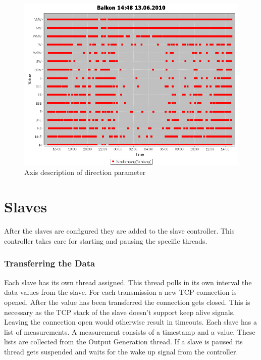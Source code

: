 \begin{figure}[ht]
    \centering
    \includegraphics[width=0.9\linewidth]{master/plot_dir.png}
    \caption{Axis description of direction parameter}
    \label{fig:dir}
\end{figure}

\section{Slaves} %
\label{sec:slaves}

After the slaves are configured they are added to the slave controller. This controller takes care for starting and pausing the specific threads. 

\subsubsection{Transferring the Data} %
\label{ssub:getting_the_data}
Each slave has its own thread assigned. This thread polls in its own interval the data values from the slave. For each transmission a new TCP connection is opened. After the value has been transferred the connection gets closed. This is necessary as the TCP stack of the slave doesn't support keep alive signals. Leaving the connection open would otherwise result in timeouts. Each slave has a list of measurements. A measurement consists of a timestamp and a value. These lists are collected from the Output Generation thread. If a slave is paused its thread gets suspended and waits for the wake up signal from the controller. 

